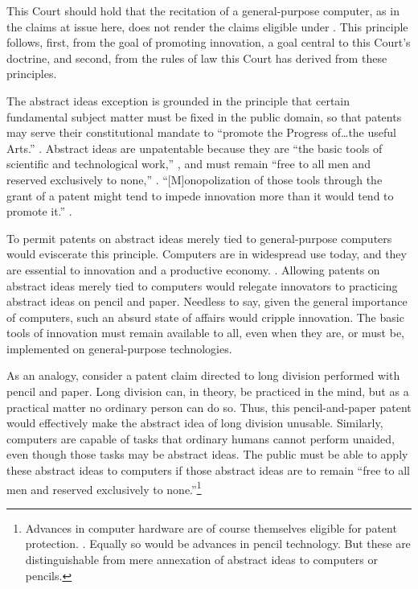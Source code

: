\documentclass{scotus}
\begin{document}
This Court should hold that the recitation of a
general-purpose computer, as in the claims at issue here, does not render the
claims eligible under .
This principle follows, first, from the goal of promoting innovation, a goal
central to
this Court's  doctrine, and second, from the rules of law
this Court has derived from these principles.

The abstract ideas exception is grounded in the principle that certain
fundamental subject matter must be fixed in the public domain, so that
patents may serve their constitutional mandate to ``promote the Progress
of\ldots the useful Arts.'' .
Abstract ideas are unpatentable because they
are ``the basic tools of scientific and technological work,'' , and must remain ``free to all men and reserved exclusively to none,''
. ``[M]onopolization
of those tools through the grant of a patent might tend to impede innovation
more than it would tend to promote it.'' .

To permit patents on abstract ideas merely tied to general-purpose computers
would eviscerate this principle.
Computers are in
widespread use today, and they are essential to innovation and a productive
economy. . 
Allowing patents on abstract ideas merely tied to computers
would relegate
innovators to practicing abstract ideas on pencil and
paper. Needless to say, given the general importance of computers, such an
absurd state of affairs would cripple innovation.
The basic tools of innovation must remain available to all, even
when they are, or must be, implemented on general-purpose technologies.

As an analogy, consider a patent claim directed to long division performed with
pencil and paper. Long division can, in theory, be practiced in the mind, but
as a practical matter no ordinary person can do so. Thus, this pencil-and-paper
patent would effectively make the abstract idea of long division unusable.
Similarly, computers are capable of tasks that ordinary
humans cannot perform unaided, even though those tasks may be
abstract ideas. The public must be able to apply these abstract ideas to
computers if those abstract ideas are to
remain ``free to all men and reserved exclusively to none.''\footnote{%
Advances in computer hardware are of course themselves eligible for patent
protection.  . Equally so would be advances in pencil technology. But these are
distinguishable from mere annexation of abstract ideas to computers or pencils.}
\end{document}
